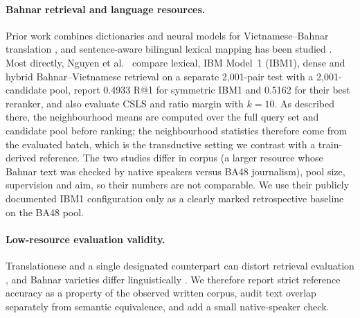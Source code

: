 \paragraph{Bahnar retrieval and language resources.} Prior work combines dictionaries and neural models for Vietnamese--Bahnar translation \cite{vo2024revitalizing,nguyen2025bartbahnar}, and sentence-aware bilingual lexical mapping has been studied \cite{nguyen2026sentenceaware}. Most directly, Nguyen et al.~\cite{nguyen2026parallelretrieval} compare lexical, IBM Model~1 (IBM1), dense and hybrid Bahnar--Vietnamese retrieval on a separate 2,001-pair test with a 2,001-candidate pool, report 0.4933 R@1 for symmetric IBM1 and 0.5162 for their best reranker, and also evaluate CSLS and ratio margin with $k=10$. As described there, the neighbourhood means are computed over the full query set and candidate pool before ranking; the neighbourhood statistics therefore come from the evaluated batch, which is the transductive setting we contrast with a train-derived reference. The two studies differ in corpus (a larger resource whose Bahnar text was checked by native speakers versus BA48 journalism), pool size, supervision and aim, so their numbers are not comparable. We use their publicly documented IBM1 configuration only as a clearly marked retrospective baseline on the BA48 pool.

\paragraph{Low-resource evaluation validity.} Translationese and a single designated counterpart can distort retrieval evaluation \cite{ni2022original,fomicheva2020multi}, and Bahnar varieties differ linguistically \cite{dinh2026registers}. We therefore report strict reference accuracy as a property of the observed written corpus, audit text overlap separately from semantic equivalence, and add a small native-speaker check.
